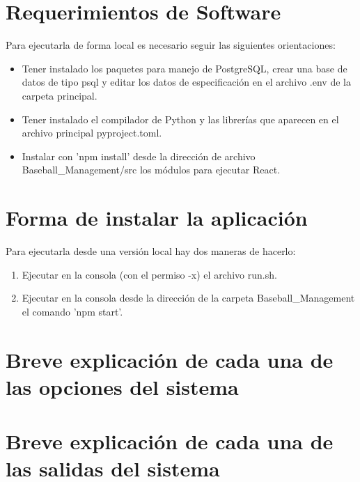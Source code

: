 \documentclass{report}
\begin{document}
    \section*{Requerimientos de Software}
    Para ejecutarla de forma local es necesario seguir las siguientes orientaciones: 
    \begin{itemize}
        \item Tener instalado los paquetes para manejo de PostgreSQL, crear una base de datos de tipo psql y editar 
        los datos de especificación en el archivo .env de la carpeta principal.
        \item Tener instalado el compilador de Python y las librerías que aparecen en el archivo principal 
        pyproject.toml.
        \item Instalar con 'npm install' desde la dirección de archivo Baseball\_Management/src los módulos para 
        ejecutar React.
    \end{itemize}

    \section*{Forma de instalar la aplicación}
    Para ejecutarla desde una versión local hay dos maneras de hacerlo:
    \begin{enumerate}
        \item Ejecutar en la consola (con el permiso -x) el archivo run.sh.
        \item Ejecutar en la consola desde la dirección de la carpeta Baseball\_Management el comando 'npm start'.
    \end{enumerate}

    \section*{Breve explicación de cada una de las opciones del sistema}

    \section*{Breve explicación de cada una de las salidas del sistema}
\end{document}
